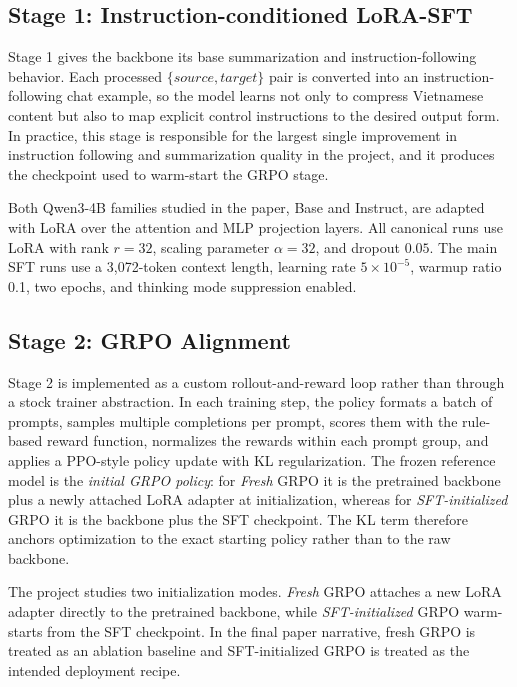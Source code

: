 \documentclass[11pt]{article}
\begin{document}
\subsection{Stage 1: Instruction-conditioned LoRA-SFT}
Stage 1 gives the backbone its base summarization and instruction-following
behavior. Each processed $\{source, target\}$ pair is converted into an
instruction-following chat example, so the model learns not only to compress
Vietnamese content but also to map explicit control instructions to the
desired output form. In practice, this stage is responsible for the largest
single improvement in instruction following and summarization quality in the
project, and it produces the checkpoint used to warm-start the GRPO stage.

Both Qwen3-4B families studied in the paper, Base and Instruct, are adapted
with LoRA over the attention and MLP projection layers. All canonical runs use
LoRA with rank $r = 32$, scaling parameter $\alpha = 32$, and dropout $0.05$. The main SFT
runs use a 3,072-token context length, learning rate $5\times10^{-5}$,
warmup ratio 0.1, two epochs, and thinking mode suppression enabled.

\subsection{Stage 2: GRPO Alignment}
Stage 2 is implemented as a custom rollout-and-reward loop rather than
through a stock trainer abstraction. In each training step, the policy formats
a batch of prompts, samples multiple completions per prompt, scores them with
the rule-based reward function, normalizes the rewards within each prompt group, and applies
a PPO-style policy update with KL regularization. The frozen reference model
is the \emph{initial GRPO policy}: for \emph{Fresh} GRPO it is the pretrained
backbone plus a newly attached LoRA adapter at initialization, whereas for
\emph{SFT-initialized} GRPO it is the backbone plus the SFT checkpoint. The
KL term therefore anchors optimization to the exact starting policy rather
than to the raw backbone.

The project studies two initialization modes. \emph{Fresh} GRPO attaches a
new LoRA adapter directly to the pretrained backbone, while
\emph{SFT-initialized} GRPO warm-starts from the SFT checkpoint. In the final
paper narrative, fresh GRPO is treated as an ablation baseline and
SFT-initialized GRPO is treated as the intended deployment recipe.
\end{document}
